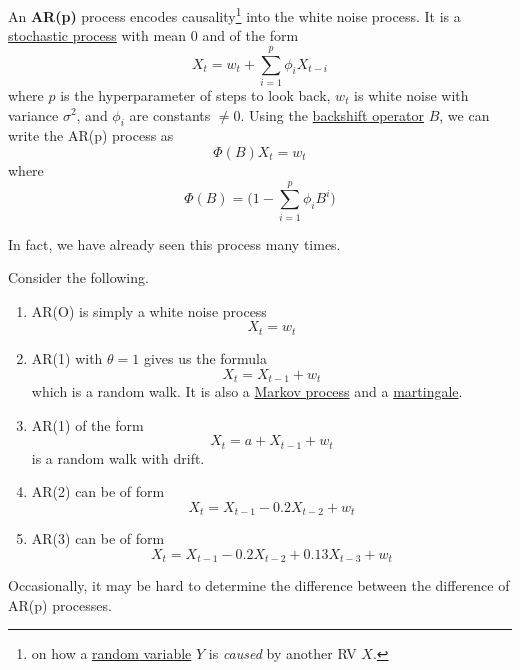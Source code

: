 \documentclass{article}
\begin{document}
  \begin{definition}
    \label{def:autoregressive-process}
    An \textbf{AR(p)} process encodes causality\footnote{on how a \hyperref[prob-def:random-variable]{random variable} $Y$ is \textit{caused} by another RV $X$.} into the white noise process. It is a \hyperref[sp-def:stochastic-process]{stochastic process} with mean $0$ and of the form 
    \begin{equation}
      X_t = w_t + \sum_{i=1}^p \phi_i X_{t - i}
    \end{equation}
    where $p$ is the hyperparameter of steps to look back, $w_t$ is white noise with variance $\sigma^2$, and $\phi_i$ are constants $\neq 0$. Using the \hyperref[def:backshift-operator]{backshift operator} $B$, we can write the AR(p) process as 
    \begin{equation}
      \Phi(B) X_t = w_t
    \end{equation}
    where 
    \begin{equation}
      \Phi(B) = \bigg( 1 - \sum_{i=1}^p \phi_i B^i \bigg)
    \end{equation}
  \end{definition}

  In fact, we have already seen this process many times. 
  
  \begin{example}[AR(p) Processes]
    \label{ex:ar-p-processes}
    Consider the following. 
    \begin{enumerate}
      \item AR(O) is simply a white noise process 
        \begin{equation}
          X_t = w_t
        \end{equation}
      \item AR(1) with $\theta = 1$ gives us the formula 
        \begin{equation}
          X_t = X_{t-1} + w_t
        \end{equation}
        which is a random walk. It is also a \hyperref[com-def:markov-process]{Markov process} and a \hyperref[sp-def:martingale]{martingale}. 
      \item AR(1) of the form 
        \begin{equation}
          X_t = a + X_{t-1} + w_t
        \end{equation}
        is a random walk with drift. 
      \item AR(2) can be of form 
        \begin{equation}
          X_t = X_{t-1} - 0.2 X_{t-2} + w_t
        \end{equation}
      \item AR(3) can be of form 
        \begin{equation}
          X_t = X_{t-1} - 0.2 X_{t-2} + 0.13 X_{t-3} + w_t
        \end{equation}
    \end{enumerate}
    Occasionally, it may be hard to determine the difference between the difference of AR(p) processes. 
  \end{example}
\end{document}
